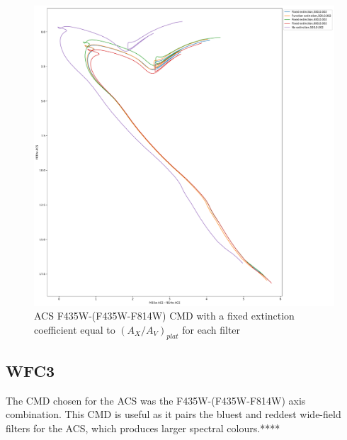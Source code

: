 \documentclass[12pt, a4paper]{report}
\begin{document}
\begin{figure}[h]
\begin{center}
\includegraphics[scale=0.3]{../basti_isochrones_10_13Gyr/Extinction_T50k_FeH0fix_func_f435wACS_f435wACSmf814wACS_500_400_600_Myr_FeH_0p002_ref_noext_Av_1p0.pdf}
\caption{ACS F435W-(F435W-F814W) CMD with a fixed extinction coefficient equal to $(A_{X}/A_{V})_{plat}$ for each filter}
\label{acs_isoc_T50k}
\end{center}
\end{figure}

\subsection{WFC3} \label{WFC3_isoc}

The CMD chosen for the ACS was the F435W-(F435W-F814W) axis combination. This CMD is useful as it pairs the bluest and reddest wide-field filters for the ACS, which produces larger spectral colours.****
\end{document}
